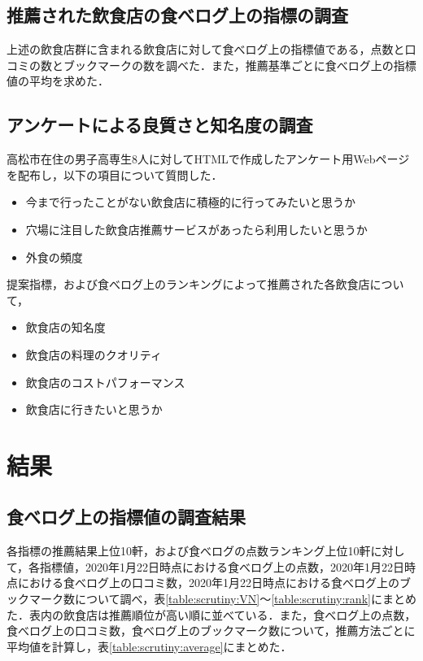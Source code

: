 	\subsection{推薦された飲食店の食べログ上の指標の調査}\label{exp:scrutiny}

		上述の飲食店群に含まれる飲食店に対して食べログ上の指標値である，点数と口コミの数とブックマークの数を調べた．また，推薦基準ごとに食べログ上の指標値の平均を求めた．

	\subsection{アンケートによる良質さと知名度の調査}\label{exp:questionnaire}

		高松市在住の男子高専生8人に対してHTMLで作成したアンケート用Webページを配布し，以下の項目について質問した．
		\begin{itemize}
			\item 今まで行ったことがない飲食店に積極的に行ってみたいと思うか
			\item 穴場に注目した飲食店推薦サービスがあったら利用したいと思うか
			\item 外食の頻度
		\end{itemize}
		提案指標，および食べログ上のランキングによって推薦された各飲食店について，
		\begin{itemize}
			\item 飲食店の知名度
			\item 飲食店の料理のクオリティ
			\item 飲食店のコストパフォーマンス
			\item 飲食店に行きたいと思うか
		\end{itemize}
\section{結果}
	\subsection{食べログ上の指標値の調査結果}
	各指標の推薦結果上位10軒，および食べログの点数ランキング上位10軒に対して，各指標値，2020年1月22日時点における食べログ上の点数，2020年1月22日時点における食べログ上の口コミ数，2020年1月22日時点における食べログ上のブックマーク数について調べ，表\ref{table:scrutiny:VN}〜\ref{table:scrutiny:rank}にまとめた．表内の飲食店は推薦順位が高い順に並べている．また，食べログ上の点数，食べログ上の口コミ数，食べログ上のブックマーク数について，推薦方法ごとに平均値を計算し，表\ref{table:scrutiny:average}にまとめた．
	
	
	
	
	
	\newpage

